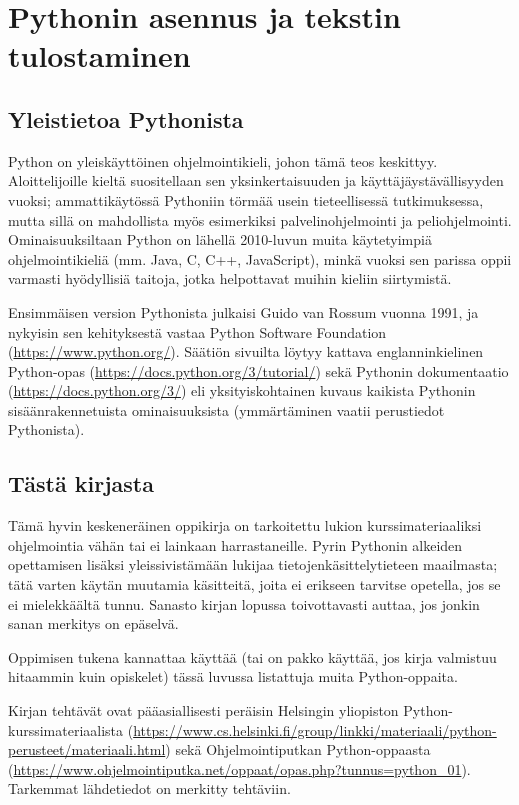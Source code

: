 \chapter{Pythonin asennus ja tekstin tulostaminen}

\section{Yleistietoa Pythonista}

Python on yleiskäyttöinen ohjelmointikieli, johon tämä teos keskittyy. Aloittelijoille kieltä suositellaan sen yksinkertaisuuden ja käyttäjäystävällisyyden vuoksi; ammattikäytössä Pythoniin törmää usein tieteellisessä tutkimuksessa, mutta sillä on mahdollista myös esimerkiksi palvelinohjelmointi ja peliohjelmointi. Ominaisuuksiltaan Python on lähellä 2010-luvun muita käytetyimpiä ohjelmointikieliä (mm. Java, C, C++, JavaScript), minkä vuoksi sen parissa oppii varmasti hyödyllisiä taitoja, jotka helpottavat muihin kieliin siirtymistä.

Ensimmäisen version Pythonista julkaisi Guido van Rossum vuonna 1991, ja nykyisin sen kehityksestä vastaa Python Software Foundation (\url{https://www.python.org/}). Säätiön sivuilta löytyy kattava englanninkielinen Python-opas (\url{https://docs.python.org/3/tutorial/}) sekä Pythonin \gls{dokumentaatio} (\url{https://docs.python.org/3/}) eli yksityiskohtainen kuvaus kaikista Pythonin sisäänrakennetuista ominaisuuksista (ymmärtäminen vaatii perustiedot Pythonista).

\section{Tästä kirjasta}

Tämä hyvin keskeneräinen oppikirja on tarkoitettu lukion kurssimateriaaliksi ohjelmointia vähän tai ei lainkaan harrastaneille. Pyrin Pythonin alkeiden opettamisen lisäksi yleissivistämään lukijaa tietojenkäsittelytieteen maailmasta; tätä varten käytän muutamia käsitteitä, joita ei erikseen tarvitse opetella, jos se ei mielekkäältä tunnu. Sanasto kirjan lopussa toivottavasti auttaa, jos jonkin sanan merkitys on epäselvä.

Oppimisen tukena kannattaa käyttää (tai on pakko käyttää, jos kirja valmistuu hitaammin kuin opiskelet) tässä luvussa listattuja muita Python-oppaita.

Kirjan tehtävät ovat pääasiallisesti peräisin Helsingin yliopiston Python-kurssimateriaalista (\url{https://www.cs.helsinki.fi/group/linkki/materiaali/python-perusteet/materiaali.html}) sekä Ohjelmointiputkan Python-oppaasta (\url{https://www.ohjelmointiputka.net/oppaat/opas.php?tunnus=python_01}). Tarkemmat lähdetiedot on merkitty tehtäviin.

